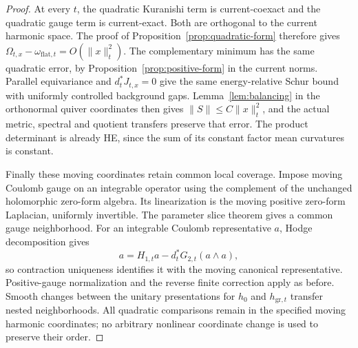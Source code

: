 \begin{proof}
At every $t$, the quadratic Kuranishi term is current-coexact and
the quadratic gauge term is current-exact. Both are orthogonal to
the current harmonic space. The proof of
Proposition~\ref{prop:quadratic-form} therefore gives
$\Omega_{t,x}-\omega_{\mathrm{flat},t}=O(\|x\|_t^2)$.
The complementary minimum has the same quadratic error, by
Proposition~\ref{prop:positive-form} in the current norms.
Parallel equivariance and $d_t^*J_{t,x}=0$ give the same
energy-relative Schur bound with uniformly controlled background
gaps. Lemma~\ref{lem:balancing} in the orthonormal quiver coordinates
then gives $\|S\|\le C\|x\|_t^2$, and the actual metric, spectral and
quotient transfers preserve that error. The product determinant
is already HE, since the sum of its constant factor mean curvatures
is constant.

Finally these moving coordinates retain common local coverage.
Impose moving Coulomb gauge on an integrable operator using the
complement of the unchanged holomorphic zero-form algebra.
Its linearization is the moving positive zero-form Laplacian,
uniformly invertible. The parameter slice theorem gives a common
gauge neighborhood. For an integrable Coulomb representative $a$,
Hodge decomposition gives
\[
 a=H_{1,t}a-d_t^*G_{2,t}(a\wedge a),
\]
so contraction uniqueness identifies it with the moving canonical
representative. Positive-gauge normalization and the reverse
finite correction apply as before. Smooth changes between the
unitary presentations for $h_0$ and $h_{\mathrm{gr},t}$ transfer
nested neighborhoods. All quadratic comparisons remain in the
specified moving harmonic coordinates; no arbitrary nonlinear
coordinate change is used to preserve their order.
\end{proof}

